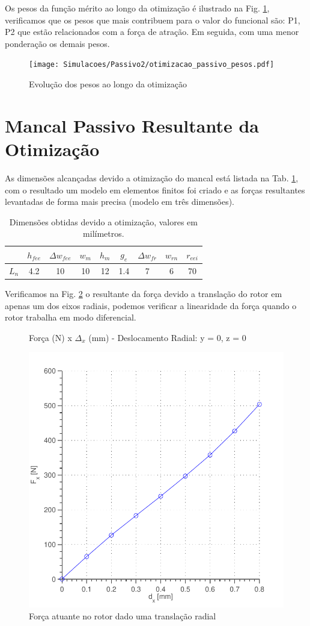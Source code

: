 Os pesos da função mérito ao longo da otimização é ilustrado na Fig. \ref{fig:otimizacao_passivo_pesos}, verificamos que os pesos que mais contribuem para o valor do funcional são: P1, P2 que estão relacionados com a força de atração. Em seguida, com uma menor ponderação os demais pesos. 

\begin{figure}[th!]
	\centering
	\texttt{[image: Simulacoes/Passivo2/otimizacao\_passivo\_pesos.pdf]}
	\caption{Evolução dos pesos ao longo da otimização}
	\label{fig:otimizacao_passivo_pesos}
\end{figure} 

\section{Mancal Passivo Resultante da Otimização}

As dimensões alcançadas devido a otimização do mancal está listada na Tab. \ref{tab:passivo:dimensoes:otimizado}, com o resultado um modelo em elementos finitos foi criado e as forças resultantes levantadas de forma mais precisa (modelo em três dimensões).

\begin{table}[ht!]
	\centering
	\begin{tabular}{c c c c c c c c c}
		& $h_{fee}$ &$\Delta w_{fee}$ & $w_m$ & $h_m$  & $g_e$ & $\Delta w_{fr}$ & $w_{rn}$ & $r_{eei}$ \\ \hline \hline
		$L_{n}$  	&  4.2 &   10 &   10 &    12 &   1.4 &  7 &   6 &    70 \\
	\end{tabular} 
	\caption{Dimensões obtidas devido a otimização, valores em milímetros.}
	\label{tab:passivo:dimensoes:otimizado} 
\end{table} 

Verificamos na Fig. \ref{fig:forca:passivo:otimizado:fem:dx} o resultante  da força devido a  translação do rotor em apenas um dos eixos radiais, podemos verificar a linearidade da força quando o rotor trabalha em modo diferencial.  

\begin{figure}[!ht]
\centering
\caption*{Força (N) x $\Delta_x$ (mm) - Deslocamento Radial: y = 0, z = 0}
\includegraphics[width=0.6 \columnwidth,angle=0]{Figs/Simulacoes/Passivo2/fem/passivo_otimizado_fem_dx}
\caption{Força atuante no rotor dado uma translação radial}
\label{fig:forca:passivo:otimizado:fem:dx}
\end{figure} 

